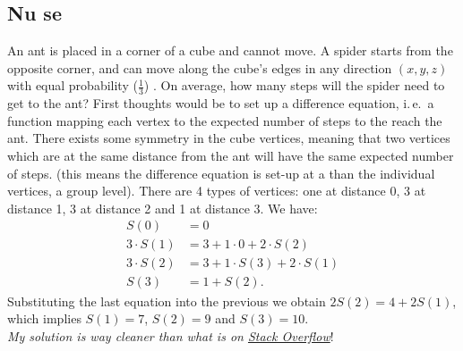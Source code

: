 \subsection{Nu se}


\begin{qanda}
    \Q An ant is placed in a corner of a cube and cannot move. A spider starts from the opposite corner, and can move along the cube's edges in any direction $(x,y,z)$ with equal probability ($\frac{1}{3}$) . On average, how many steps will the spider need to get to the ant?
    \A 
    First thoughts would be to set up a difference equation, i.\,e.\ a function mapping each vertex to the expected number of steps to the reach the ant.
    There exists some symmetry in the cube vertices, meaning that two vertices which are at the same distance from the ant will have the same expected number of steps. 
    (this means the difference equation is set-up at a  than the individual vertices, a group level).
    There are 4 types of vertices: one at distance 0, 3 at distance 1, 3 at distance 2 and 1 at distance 3. We have:
    \begin{align*}
        S(0) &= 0 \\
        3 \cdot S(1) &= 3 + 1 \cdot 0 + 2 \cdot S(2) \\
        3 \cdot S(2) &= 3 + 1 \cdot S(3) + 2 \cdot  S(1) \\
        S(3) &= 1 + S(2).
    \end{align*}
    Substituting the last equation into the previous we obtain $2 S(2) = 4 + 2 S(1)$, which implies $S(1) = 7$, $S(2) = 9$ and $S(3) = 10$. \\
    \emph{My solution is way cleaner than what is on \href{https://stats.stackexchange.com/questions/139384/random-walk-on-the-edges-of-a-cube}{Stack Overflow}}!
\end{qanda}

